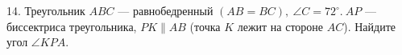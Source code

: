 14. Треугольник $ABC$ --- равнобедренный $(AB=BC),\ \angle C=72^\circ.\ AP$ ---
биссектриса треугольника, $PK\parallel AB$ (точка $K$ лежит на стороне $AC$). Найдите угол $\angle KPA.$\\
